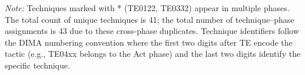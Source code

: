 \documentclass[11pt,a4paper]{article}
\begin{document}
\vspace{0.3cm}
\noindent\textit{Note:} Techniques marked with * (TE0122, TE0332) appear in multiple phases. The total count of unique techniques is 41; the total number of technique--phase assignments is 43 due to these cross-phase duplicates. Technique identifiers follow the DIMA numbering convention where the first two digits after TE encode the tactic (e.g., TE04xx belongs to the Act phase) and the last two digits identify the specific technique.
\end{document}

